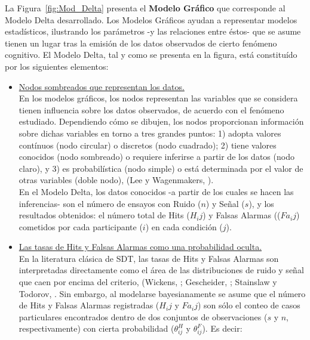 La Figura~\ref{fig:Mod_Delta} presenta el \textbf{Modelo Gráfico} que corresponde al Modelo Delta desarrollado. Los Modelos Gráficos ayudan a representar modelos estadísticos, ilustrando los parámetros -y las relaciones entre éstos- que se asume tienen un lugar tras la emisión de los datos observados de cierto fenómeno cognitivo. El Modelo Delta, tal y como se presenta en la figura, está constituído por los siguientes elementos:


\begin{itemize}
\item \underline{Nodos sombreados que representan los datos.}\\

En los modelos gráficos, los nodos representan las variables que se considera tienen influencia sobre los datos observados, de acuerdo con el fenómeno estudiado. Dependiendo cómo se dibujen, los nodos proporcionan información sobre dichas variables en torno a tres grandes puntos: 1) adopta valores contínuos (nodo circular) o discretos (nodo cuadrado); 2) tiene valores conocidos (nodo sombreado) o requiere inferirse a partir de los datos (nodo claro), y 3) es probabilística (nodo simple) o está determinada por el valor de otras variables (doble nodo), (Lee y Wagenmakers, \citeyear{LeeBook}).\\

En el Modelo Delta, los datos conocidos -a partir de los cuales se hacen las inferencias- son el número de ensayos con Ruido ($n$) y Señal ($s$), y los resultados obtenidos: el número total de Hits ($H_ij$) y Falsas Alarmas (($Fa_ij$) cometidos por cada participante ($i$) en cada condición ($j$).\\

\item \underline{Las tasas de Hits y Falsas Alarmas como una probabilidad oculta.}\\ 

En la literatura clásica de SDT, las tasas de Hits y Falsas Alarmas son interpretadas directamente como el área de las distribuciones de ruido y señal que caen por encima del criterio, (Wickens, \citeyear{Wickens1}; Gescheider, \citeyear{Gescheider}; Stainslaw y Todorov, \citeyear{Stainslaw1999}. Sin embargo, al modelarse bayesianamente se asume que el número de Hits y Falsas Alarmas registradas ($H_ij$ y $Fa_ij$) son sólo el conteo de casos particulares encontrados dentro de dos conjuntos de observaciones ($s$ y $n$, respectivamente) con cierta probabilidad ($\theta^H_{ij}$ y $\theta^F_{ij}$). Es decir:


\end{itemize}
